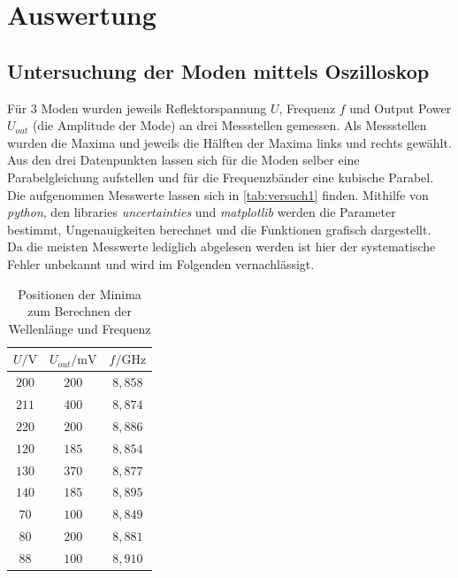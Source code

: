 \chapter{Auswertung}
\label{cha:Auswertung}

\section{Untersuchung der Moden mittels Oszilloskop}
Für 3 Moden wurden jeweils Reflektorspannung $U$, Frequenz $f$ und Output Power $U_{out}$ (die Amplitude der Mode) an drei Messstellen gemessen.
Als Messstellen wurden die Maxima und jeweils die Hälften der Maxima links und rechts gewählt.\\
Aus den drei Datenpunkten lassen sich für die Moden selber eine Parabelgleichung aufstellen und für die Frequenzbänder eine kubische Parabel.\\
Die aufgenommen Messwerte lassen sich in \autoref{tab:versuch1} finden. Mithilfe von \textit{python}, den libraries \textit{uncertainties}\cite{uncertainties} und
\textit{matplotlib}\cite{matplotlib} werden die Parameter bestimmt, Ungenauigkeiten berechnet und die Funktionen grafisch dargestellt.\\
Da die meisten Messwerte lediglich abgelesen werden ist hier der systematische Fehler unbekannt und wird im Folgenden vernachlässigt.\\
\begin{table}[htbp] 
    \centering 
    \begin{tabular}{c c c} 
        \toprule $U / \mathrm{V}$ & $U_{out} / \mathrm{mV}$ & $f / \mathrm{GHz}$ \\ 
        \midrule 
        $200$  &  $ 200 $ &  $8,858$ \\
        $211$  &  $ 400 $ &  $8,874$ \\
        $220$  &  $ 200 $ &  $8,886$ \\
        \hline
        $120$  &  $ 185 $ &  $8,854$ \\
        $130$  &  $ 370 $ &  $8,877$ \\
        $140$  &  $ 185 $ &  $8,895 $\\
        \hline
        $70$  &  $ 100 $ &  $8,849$ \\
        $80$  &  $ 200 $ &  $8,881$ \\
        $88$  &  $ 100 $ &  $8,910$ \\
        \bottomrule 
    \end{tabular} 
    \caption[Tabelle]{Positionen der Minima zum Berechnen der Wellenlänge und Frequenz} 
    \label{tab:versuch1} 
\end{table}
